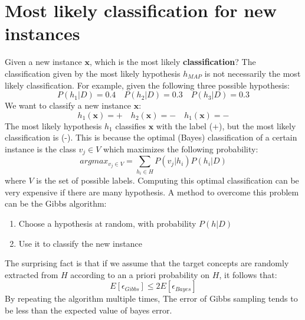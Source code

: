  \section{Most likely classification for new instances}
 Given a new instance $\textbf{x}$, which is the most likely \textbf{classification}?
 The classification given by the most likely hypothesis $h_{MAP}$ is not necessarily the most likely classification. For example, given the following three possible hypothesis:
 \[P(h_{1} | D) = 0.4 \quad P(h_{2} | D) = 0.3 \quad P(h_{3} | D) = 0.3\]
 We want to classify a new instance $\textbf{x}$:
 \[h_{1}(\textbf{x}) = + \quad h_{2}(\textbf{x}) = - \quad h_{1}(\textbf{x}) = -\]
 The most likely hypothesis $h_{1}$ classifies $\textbf{x}$ with the label (+), but the most likely classification is (-). This is because the optimal (Bayes) classification of a certain instance is the class $v_{j} \in V$ which maximizes the following probability:
 \[argmax_{v_{j} \in V} = \sum_{h_{i} \in H}P(v_{j} | h_{i})P(h_{i} | D)\]
 where $V$ is the set of possible labels.\newline\newline
 Computing this optimal classification can be very expensive if there are many hypothesis. A method to overcome this problem can be the Gibbs algorithm:
 \begin{enumerate}
     \item Choose a hypothesis at random, with probability $P(h | D)$
     \item Use it to classify the new instance
 \end{enumerate}
The surprising fact is that if we assume that the target concepts are randomly extracted from $H$ according to an a priori probability on $H$, it follows that:
\[E[\epsilon_{Gibbs}] \leq 2E[\epsilon_{Bayes}]\]
By repeating the algorithm multiple times, The error of Gibbs sampling tends to be less than the expected value of bayes error. 
